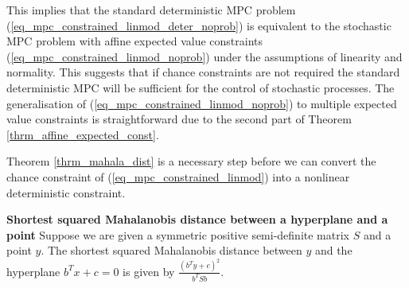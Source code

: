 This implies that the standard deterministic MPC problem (\ref{eq_mpc_constrained_linmod_deter_noprob}) is equivalent to the stochastic MPC problem with affine expected value constraints (\ref{eq_mpc_constrained_linmod_noprob}) under the assumptions of linearity and normality. This suggests that if chance constraints are not required the standard deterministic MPC will be sufficient for the control of stochastic processes. The generalisation of (\ref{eq_mpc_constrained_linmod_noprob}) to multiple expected value constraints is straightforward due to the second part of Theorem \ref{thrm_affine_expected_const}. 

Theorem \ref{thrm_mahala_dist} is a necessary step before we can convert the chance constraint of (\ref{eq_mpc_constrained_linmod}) into a nonlinear deterministic constraint.
\begin{thrm}
\textbf{Shortest squared Mahalanobis distance between a hyperplane and a point} Suppose we are given a symmetric positive semi-definite matrix $S$ and a point $y$. The shortest squared Mahalanobis distance between $y$ and the hyperplane $b^Tx+c=0$ is given by $\frac{(b^Ty+c)^2}{b^TSb}$.
\label{thrm_mahala_dist}
\end{thrm}
